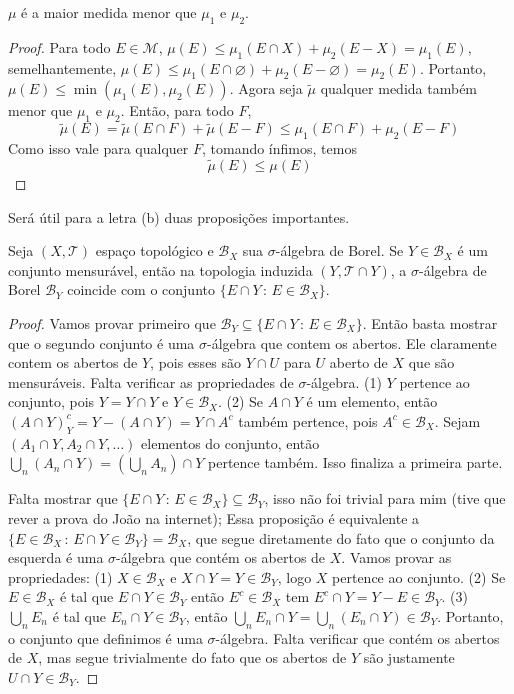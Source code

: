 \begin{prop}
    $\mu$ é a maior medida menor que $\mu_1$ e $\mu_2$.
\end{prop}
\begin{proof}
    Para todo $E \in \mathcal{M}$, $\mu(E) \leq \mu_1(E \cap X) + \mu_2(E - X) = \mu_1(E)$, 
    semelhantemente, $\mu(E) \leq \mu_1(E \cap \varnothing) + \mu_2(E - \varnothing) = \mu_2(E)$. Portanto,
    $\mu(E) \leq \min(\mu_1(E), \mu_2(E))$. Agora seja $\tilde{\mu}$ qualquer medida também menor que $\mu_1$ e $\mu_2$.
    Então, para todo $F$,
    $$\tilde{\mu}(E) = \tilde{\mu}(E\cap F) + \tilde{\mu}(E - F) \leq \mu_1(E \cap F) + \mu_2(E - F)$$
    Como isso vale para qualquer $F$, tomando ínfimos, temos
    $$\tilde{\mu}(E) \leq \mu(E)$$
\end{proof}

\prob
Será útil para a letra (b) duas proposições importantes.
\begin{prop} \label{prop:borel_induzido}
    Seja $(X,\mathcal{T})$ espaço topológico e $\mathcal{B}_X$ sua $\sigma$-álgebra de Borel. Se $Y \in \mathcal{B}_X$ é um conjunto mensurável, então na topologia induzida $(Y,\mathcal{T} \cap Y)$, a $\sigma$-álgebra de Borel $\mathcal{B}_Y$ coincide com o conjunto $\{E \cap Y \, : \, E \in \mathcal{B}_X\}$.
\end{prop}
\begin{proof} 
    Vamos provar primeiro que $\mathcal{B}_Y \subseteq \{E \cap Y \, : \, E \in \mathcal{B}_X\}$.
    Então basta mostrar que o segundo conjunto é uma $\sigma$-álgebra que contem os abertos.
    Ele claramente contem os abertos de $Y$, pois esses são $Y \cap U$ para $U$ aberto de $X$ que são mensuráveis. Falta verificar as propriedades de $\sigma$-álgebra. (1) $Y$ pertence ao conjunto, pois $Y = Y \cap Y$ e $Y \in \mathcal{B}_X$. (2) Se $A \cap Y$ é um elemento, então
    $(A \cap Y)^c_Y = Y - (A \cap Y) = Y \cap A^c$ também pertence, pois $A^c \in \mathcal{B}_X$. Sejam $(A_1\cap Y, A_2 \cap Y, \dots)$ elementos do conjunto, então $\bigcup_n (A_n \cap Y) = (\bigcup_n A_n) \cap Y$ pertence também. Isso finaliza a primeira parte.

    Falta mostrar que $\{E \cap Y \, : \, E \in \mathcal{B}_X\} \subseteq \mathcal{B}_Y$, isso não foi trivial para mim (tive que rever a prova do João na internet); Essa proposição é equivalente a $\{E \in \mathcal{B}_X \, : \, E \cap Y \in \mathcal{B}_Y\} = \mathcal{B}_X$, que segue diretamente do fato que o conjunto da esquerda é uma $\sigma$-álgebra que contém os abertos de $X$. Vamos provar as propriedades: (1) $X \in \mathcal{B}_X$ e $X \cap Y = Y \in \mathcal{B}_Y$, logo $X$ pertence ao conjunto. (2) Se $E \in \mathcal{B}_X$ é tal que $E \cap Y \in \mathcal{B}_Y$ então $E^c \in \mathcal{B}_X$ tem $E^c \cap Y = Y - E \in \mathcal{B}_Y$.
    (3) $\bigcup_n E_n$ é tal que $E_n \cap Y \in \mathcal{B}_Y$, então $\bigcup_n E_n \cap Y = \bigcup_n (E_n \cap Y) \in \mathcal{B}_Y$. Portanto, o conjunto que definimos é uma $\sigma$-álgebra. Falta verificar que contém os abertos de $X$, mas segue trivialmente do fato que os abertos de $Y$ são justamente $U \cap Y \in \mathcal{B}_Y$.
\end{proof}
